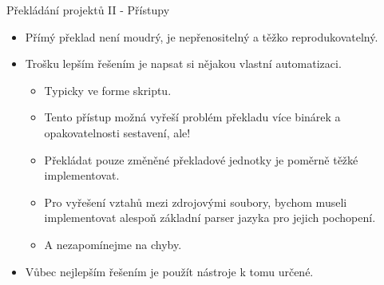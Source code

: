 \documentclass[handout]{beamer}
\begin{document}
\begin{frame}{Překládání projektů II - Přístupy}
    \begin{itemize}
        \item Přímý překlad není moudrý, je nepřenositelný a těžko reprodukovatelný.
        \item Trošku lepším řešením je napsat si nějakou vlastní automatizaci.
            \begin{itemize}
                \item Typicky ve forme skriptu.
                \item Tento přístup možná vyřeší problém překladu více binárek a opakovatelnosti sestavení, ale!
                \item Překládat pouze změněné překladové jednotky je poměrně těžké implementovat.
                \item Pro vyřešení vztahů mezi zdrojovými soubory, bychom museli implementovat alespoň základní parser
                    jazyka pro jejich pochopení.
                \item A nezapomínejme na chyby.
                \end{itemize}
            \item Vůbec nejlepším řešením je použít nástroje k tomu určené.
    \end{itemize}
\end{frame}
\end{document}
